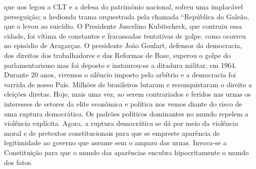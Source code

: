 que nos legou a CLT e a defesa do patrimônio nacional, sofreu uma
implacável perseguição; a hedionda trama orquestrada pela chamada
``República do Galeão, que o levou ao suicídio. O Presidente Juscelino
Kubitscheck, que contruiu essa cidade, foi vítima de constantes e
fracassadas tentativas de golpe, como ocorreu no episódio de Aragarças.
O presidente João Goulart, defensor da democracia, dos direitos dos
trabalhadores e das Reformas de Base, superou o golpe do parlamentarismo
mas foi deposto e instaurou-se a ditadura militar, em 1964. Durante 20
anos, vivemos o silêncio imposto pelo arbítrio e a democracia foi
varrida de nosso País. Milhões de brasileiros lutaram e reconquistaram o
direito a eleições diretas. Hoje, mais uma vez, ao serem contrariados e
feridos nas urnas os interesses de setores da elite econômica e política
nos vemos diante do risco de uma ruptura democrática. Os padrões
políticos dominantes no mundo repelem a violência explícita. Agora, a
ruptura democrática se dá por meio da violência moral e de pretextos
constitucionais para que se empreste aparência de legitimidade ao
governo que assume sem o amparo das urnas. Invoca-se a Constituição para
que o mundo das aparências encubra hipocritamente o mundo dos fatos.

